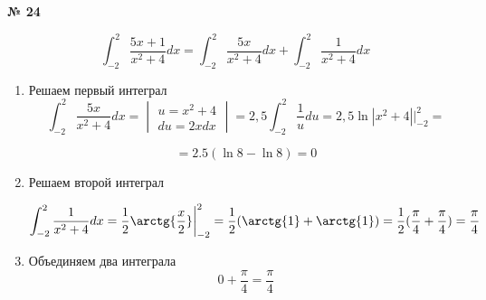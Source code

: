 \documentclass{article}
\begin{document}
\textbf{№ 24} 

\begingroup

\Large

$$ \int_{-2}^{2} \frac{5x+1}{x^2+4} dx 
= \int_{-2}^{2} \frac{5x}{x^2+4} dx + \int_{-2}^{2} \frac{1}{x^2+4} dx $$

\begin{enumerate}
    \item Решаем первый интеграл
$$ \int_{-2}^{2} \frac{5x}{x^2+4} dx 
= \begin{vmatrix} u = x^2+4 \\ 
                 du = 2xdx \end{vmatrix} 
= 2,5 \int_{-2}^{2} \frac{1}{u} du 
= 2,5 \ln{\left| x^2+4 \right|} \bigg\vert_{-2}^{2} 
= $$

$$ = 2.5 (\ln{8} - \ln{8})
= 0 $$

    \item Решаем второй интеграл

$$ \int_{-2}^{2} \frac{1}{x^2+4} dx 
= \frac{1}{2} \arctg{\frac{x}{2}} \bigg\vert_{-2}^{2}
= \frac{1}{2} (\arctg{1} + \arctg{1})
= \frac{1}{2} (\frac{\pi}{4} + \frac{\pi}{4})
= \frac{\pi}{4} $$

    \item Объединяем два интеграла
$$ 0 + \frac{\pi}{4} = \frac{\pi}{4} $$

\end{enumerate}

\endgroup
\end{document}
